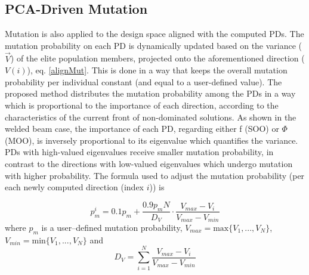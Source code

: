 

\subsection{PCA-Driven Mutation}
Mutation is also applied to the design space aligned with the computed PDs. The mutation probability on each PD is dynamically updated based on the variance ($\vec{V}$) of the elite population members, projected onto the aforementioned direction ($V(i)$), eq. \ref{alignMut}. This is done in a way that keeps the overall mutation probability per individual constant (and equal to a user-defined value). The proposed method distributes the mutation probability among the PDs  in a way which is proportional to the importance of each direction, according to the characteristics of the current front of non-dominated solutions. As shown in the welded beam case, the importance of each PD, regarding either f (SOO) or $\Phi$ (MOO), is inversely proportional to its eigenvalue which quantifies the variance.  PDs  with high-valued eigenvalues receive smaller mutation probability, in contrast to the directions with low-valued eigenvalues which undergo mutation with higher probability. The formula used to adjust the mutation probability (per each newly computed direction (index $i$)) is        

\begin{equation}
	p_m^i = 0.1 p_m + \frac{0.9 p_m N}{D_V} \cdot \frac{V_{max}-V_i}{V_{max}-V_{min}} 
     \label{alignMut}
\end{equation}
where $p_m$ is a user--defined mutation probability,  
$V_{max}=\mbox{max}\{V_1,...,V_N\}$, $V_{min}=\mbox{min}\{V_1,...,V_N\}$ and 
\begin{equation}
	D_V=\sum_{i=1}^N \frac{V_{max}-V_i}{V_{max}-V_{min}}
\label{alignMut2} %
\end{equation}





